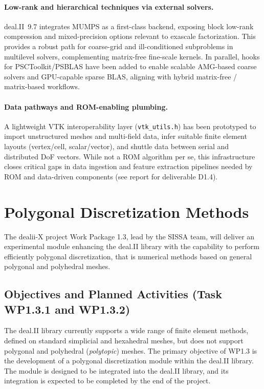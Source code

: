 \documentclass[a4paper,12pt]{article}
\begin{document}
\paragraph{Low-rank and hierarchical techniques via external solvers.}
deal.II~9.7 integrates MUMPS as a first-class backend, exposing block low-rank
compression and mixed-precision options relevant to exascale factorization.
This provides a robust path for coarse-grid and ill-conditioned subproblems in
multilevel solvers, complementing matrix-free fine-scale kernels. In parallel,
hooks for PSCToolkit/PSBLAS have been added to enable scalable AMG-based
coarse solvers and GPU-capable sparse BLAS, aligning with hybrid matrix-free /
matrix-based workflows.

\paragraph{Data pathways and ROM-enabling plumbing.}
A lightweight VTK interoperability layer (\texttt{vtk\_utils.h}) has been
prototyped to import unstructured meshes and multi-field data, infer suitable
finite element layouts (vertex/cell, scalar/vector), and shuttle data between
serial and distributed DoF vectors. While not a ROM algorithm per se, this
infrastructure closes critical gaps in data ingestion and feature extraction
pipelines needed by ROM and data-driven components (see report for deliverable
D1.4).

\section{Polygonal Discretization Methods}

 The dealii-X project Work Package 1.3, lead by the SISSA team, will deliver an experimental module enhancing the
deal.II library with the capability to perform efficiently polygonal discretization, that is numerical methods based on general polygonal and polyhedral meshes.%

\subsection{Objectives and Planned Activities (Task WP1.3.1 and WP1.3.2)}

The deal.II library currently
supports a wide range of finite element methods, defined on standard simplicial
and hexahedral meshes, but does not support polygonal and polyhedral (\emph{polytopic}) meshes.
The primary objective of WP1.3 is the development of a polygonal
discretization module within the deal.II library. The module is designed to be integrated into the deal.II library, and its integration is expected to be completed by the end of the project.
\end{document}
